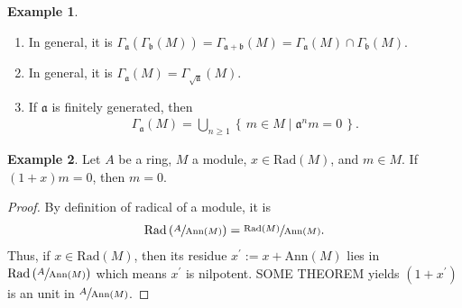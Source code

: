 \documentclass[a4paper]{book}
\theoremstyle{definition}
\newtheorem{example}{Example}[definition]
\newcommand{\makeset}[2]{\left\{\, #1 \mid #2 \,\right\}}
\begin{document}
\begin{example}
\begin{enumerate}
\begin{proof}
            ``\(\subset\)'': \(M \subset N\) implies \(\Gamma_\mathfrak{a}(M) \subset \Gamma_\mathfrak{a}(N)\). Moreover, it is \(\Gamma_\mathfrak{a}(M) \subset M\). Thus, \(\Gamma_\mathfrak{a}(M) \subset \Gamma_\mathfrak{a}(N) \cap M\).

            ``\(\supset\)'': Let \(m \in \Gamma_\mathfrak{a}(N) \cap M\). It is
            
            \begin{align*}
                m \in \Gamma_\mathfrak{a}(N) \cap M & \Rightarrow \mathfrak{a} \subset \sqrt{\mathrm{Ann}(m)} \text{ and } m \in M \text{.} \\
                & \Rightarrow m \in \Gamma_\mathfrak{a}(M) \text{.}
            \end{align*}

            Hence, \(\Gamma_\mathfrak{a}(N) \cap M \subset \Gamma_\mathfrak{a}(M)\).
        \end{proof}
            \item In general, it is \(\Gamma_\mathfrak{a}(\Gamma_\mathfrak{b}(M)) = \Gamma_{\mathfrak{a} + \mathfrak{b}}(M) = \Gamma_\mathfrak{a}(M) \cap \Gamma_\mathfrak{b}(M)\).
            \item In general, it is \(\Gamma_\mathfrak{a}(M) = \Gamma_{\sqrt{\mathfrak{a}}}(M)\).
            \item If \(\mathfrak{a}\) is finitely generated, then
            \begin{align*}
                \Gamma_\mathfrak{a}(M) = \bigcup_{n \geq 1} \makeset{m \in M}{\mathfrak{a}^n m = 0} \text{.}
            \end{align*}
    \end{enumerate}
\end{example}

\begin{example}
    Let \(A\) be a ring, \(M\) a module, \(x \in \mathrm{Rad}(M)\), and \(m \in M\). If \((1 + x)m = 0\), then \(m = 0\).
\end{example}

\begin{proof}
    By definition of radical of a module, it is
    \begin{align*}
        \mathrm{Rad} \left(\sfrac{A}{\mathrm{Ann}(M)}\right) = \sfrac{\mathrm{Rad}(M)}{\mathrm{Ann}(M)} \text{.}
    \end{align*}
    Thus, if \(x \in \mathrm{Rad}(M)\), then its residue \(x^\prime := x + \mathrm{Ann}(M)\) lies in \(\mathrm{Rad}\left(\sfrac{A}{\mathrm{Ann}(M)}\right)\) which means \(x^\prime\) is nilpotent. SOME THEOREM yields \((1 + x^\prime)\) is an unit in \(\sfrac{A}{\mathrm{Ann}(M)}\).
\end{proof}
\end{document}
